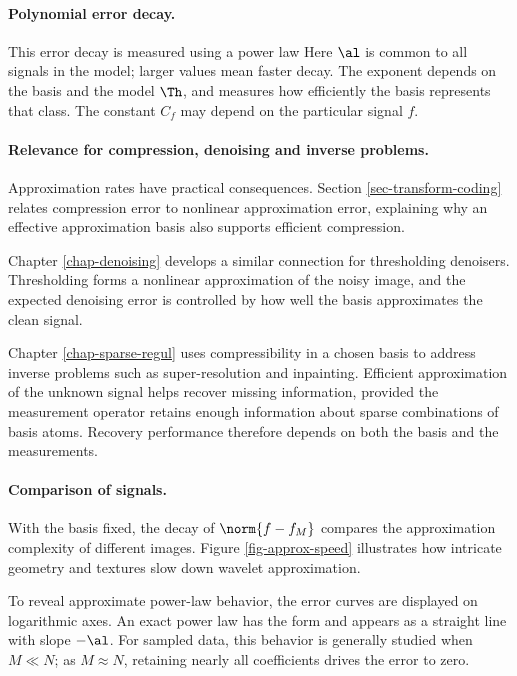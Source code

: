\paragraph{Polynomial error decay.}

This error decay is measured using a power law
Here $\al$ is common to all signals in the model; larger values mean faster decay. The exponent depends on the basis and the model $\Th$, and measures how efficiently the basis represents that class. The constant $C_f$ may depend on the particular signal $f$.

\paragraph{Relevance for compression, denoising and inverse problems.}

Approximation rates have practical consequences. Section \ref{sec-transform-coding} relates compression error to nonlinear approximation error, explaining why an effective approximation basis also supports efficient compression.

Chapter \ref{chap-denoising} develops a similar connection for thresholding denoisers. Thresholding forms a nonlinear approximation of the noisy image, and the expected denoising error is controlled by how well the basis approximates the clean signal.

Chapter \ref{chap-sparse-regul} uses compressibility in a chosen basis to address inverse problems such as super-resolution and inpainting. Efficient approximation of the unknown signal helps recover missing information, provided the measurement operator retains enough information about sparse combinations of basis atoms. Recovery performance therefore depends on both the basis and the measurements.



\paragraph{Comparison of signals.}

With the basis fixed, the decay of $\norm{f-f_M}$ compares the approximation complexity of different images. Figure \ref{fig-approx-speed} illustrates how intricate geometry and textures slow down wavelet approximation.

To reveal approximate power-law behavior, the error curves are displayed on logarithmic axes. An exact power law has the form
and appears as a straight line with slope $-\al$. For sampled data, this behavior is generally studied when $M \ll N$; as $M \approx N$, retaining nearly all coefficients drives the error to zero.


